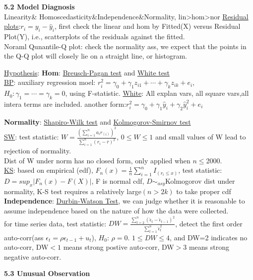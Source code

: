 \documentclass[10pt,a4paper,landscape]{article}
\begin{document}
\begin{multicols}{3}
{  \textbf{5.2 Model Diagnosis}\\
  Linearity\& Homoscedasticity\&Independence\&Normality, lin>hom>nor
  \underline{Residual plots}:$r_i=y_i-\hat{y}_i$, first check the linear and hom by Fitted(X) versus Residual Plot(Y), i.e., scatterplots of the residuals against the fitted.\\
  Noraml Qunantile-Q plot: check the normality ass, we expect that the points in the Q-Q plot will closely lie on a straight line, or histogram.
  
  \underline{Hypothesis}: \textbf{Hom}: \underline{Breusch-Pagan test} and \underline{White test}\\
  \underline{BP}: auxiliary regression moel: $r_i^2=\gamma_0+\gamma_1z_{i1}+\cdots+\gamma_k z_{ik}+e_i$, $H_0:\gamma_1=\cdots=\gamma_k=0$, using F-statistic.
  \underline{White}: All explan vars, all square vars,all intera terms are included. another form:$r_i^2=\gamma_0+\gamma_1\hat{y}_i+\gamma_2\hat{y}_i^2+e_i$
  
  \textbf{Normality}: \underline{Shapiro-Wilk test} and \underline{Kolmogorov-Smirnov test}\\
  \underline{SW}: test statistic: $W=\frac{(\sum_{i=1}^{n}a_ir_{(i)} )^2}{\sum_{i=1}^n(r_i-\overline{r})^2 }$, $0\leq W\leq 1$ and small values of W lead to rejection of normality. \\
  Dist of W under norm has no closed form, only applied when $n\leq$2000.\\
  \underline{KS}: based on empirical (edf), $F_n(x)=\frac{1}{n}\sum_{i=1}^{n}I_{(r_i\leq x)} $, test statistic:
  $D=sup_x|F_n(x)-F(X)|$, F is normal cdf, $D\sim_{asy}$Kolmogorov dist under normality,  K-S test requires a relatively large$(n>2k)$ to take proper cdf\\
  \textbf{Independence}: \underline{Durbin-Watson Test}, we can judge whether it is reasonable to assume independence based on the nature of how the data were collected. \\
  for time series data,
  test statistic: $DW=\frac{\sum_{t=2}^n(\hat{\epsilon}_{t}-\hat{\epsilon}_{t-1})^2}{\sum_{t=1}^n \hat{\epsilon}_t^2 }$, detect the first order auto-corr(ass $\epsilon_t=\rho \epsilon_{t-1}+u_t$), $H_0$: $\rho=0$. $1 \leq DW \leq 4$, and DW=2 indicates no auto-corr, DW$<1$ means strong postive auto-corr, DW$>3$ means strong negative auto-corr.
  
  \textbf{5.3 Unusual Observation}\\
  


}
\end{multicols}
\end{document}
